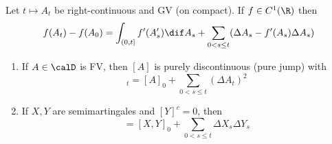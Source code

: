 \documentclass{scrreprt}
\theoremstyle{remark}
\begin{document}
\begin{prop}
	Let $t \mapsto A_t$ be right-continuous and GV (on compact). If $f \in C^1(\R)$ then
	\begin{equation}
		f(A_t) - f(A_0) = \int_{(0, t]} f'(A_s') \dif A_s + \sum_{0 < s \leq t}(\Delta A_s - f'(A_s) \Delta A_s)
	\end{equation}
\end{prop}

\begin{prop}
	\begin{enumerate}
		\item If $A \in \calD$ is FV, then $[A]$ is purely discontinuous (pure jump) with
			\begin{equation}
				[A]_t = [A]_0 + \sum_{0 < s \leq t} (\Delta A_t)^2
			\end{equation}
		\item If $X, Y$ are semimartingales and $[Y]^c = 0$, then
			\begin{equation}
				[X, Y] = [X, Y]_0 + \sum_{0 < s \leq t} \Delta X_s \Delta Y_s
			\end{equation}
	\end{enumerate}
\end{prop}
\end{document}
